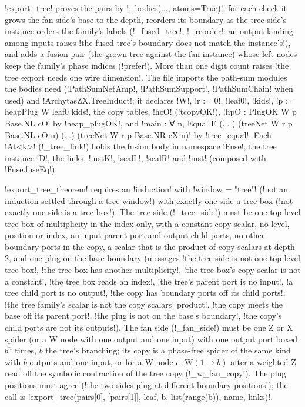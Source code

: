{{{\lexpy!export_tree! proves the pairs by \lexpy!_bodies(..., atoms=True)!; for each check it grows the
fan side's base to the depth, reorders its boundary as the tree side's instance orders the
family's labels (\lexpy!_fused_tree!, \lexpy!_reorder!: an output landing among inputs raises
\lexcode!the fused tree's boundary does not match the instance's!), and adds a fusion pair (the grown
tree against the fan instance) whose left nodes keep the family's phase indices
(\lexcode!prefer!). More than one digit count raises \lexcode!the tree export needs one wire dimension!.
The file imports the path-sum modules the bodies need (\lexlean!PathSumNetAmp!, \lexlean!PathSumSupport!,
\lexlean!PathSumChain! when used) and \lexlean!ArchytasZX.TreeInduct!; it declares \lexlean!W!,
\lexlean!r := 0!, \lexlean!leaf0!, \lexlean!kids!, \lexlean!p := heapPlug W leaf0 kids!, the copy tables,
\lexlean!hcO! (\lexlean!tcopyOK!), \lexlean!hpO : PlugOK W p Base.NL cO! by \lexlean!heap_plugOK!, and
\lexlean!main : ∀ n, Equal E (... ) (treeNet W r p Base.NL cO n) (...) (treeNet W r p Base.NR cX n)!
by \lexlean!tree_equal!. Each \lexlean!At<k>! (\lexpy!_tree_link!) holds the fusion body in namespace
\lexlean!Fuse!, the tree instance \lexlean!D!, the links, \lexlean!instK!, \lexlean!scalL!, \lexlean!scalR! and
\lexlean!inst! (composed with \lexlean!Fuse.fuseEq!).

\lexpy!export_tree_theorem! requires an \lexcode!induction! with \lexcode!window = "tree"!
(\lexcode!not an induction settled through a tree window!) with exactly one side a tree box
(\lexcode!not exactly one side is a tree box!). The tree side (\lexpy!_tree_side!) must be one
top-level tree box of multiplicity in the index only, with a constant copy scalar, no level,
position or index, an input parent port and output child ports, no other boundary ports in the
copy, a scalar that is the product of copy scalars at depth 2, and one plug on the base boundary
(messages \lexcode!the tree side is not one top-level tree box!, \lexcode!the tree box has another multiplicity!, \lexcode!the tree box's copy scalar is not a constant!, \lexcode!the tree box reads an index!, \lexcode!the tree's parent port is no input!, \lexcode!a tree child port is no output!,
\lexcode!the copy has boundary ports off its child ports!, \lexcode!the tree family's scalar is not the copy scalars' product!, \lexcode!the copy meets the base off its parent port!, \lexcode!the plug is not on the base's boundary!, \lexcode!the copy's child ports are not its outputs!). The fan side
(\lexpy!_fan_side!) must be one Z or X spider (or a W node with one output and one input) with one
output port boxed $b^{n}$ times, $b$ the tree's branching; its copy is a phase-free spider of the
same kind with $b$ outputs and one input, or for a W node $c\cdot\mathrm{W}(1\to b)$ after a
weighted Z read off the symbolic contraction of the tree copy (\lexpy!_w_fan_copy!). The plug
positions must agree (\lexcode!the two sides plug at different boundary positions!); the call is
\lexpy!export_tree(pairs[0], [pairs[1]], leaf, b, list(range(b)), name, links)!.

}}}

